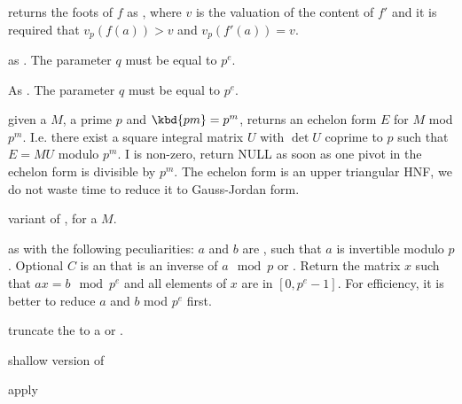 returns the foots of $f$ as , where $v$ is the valuation
of the content of $f'$ and it is required that $v_p(f(a))>v$ and
$v_p(f'(a))=v$.


as . The parameter $q$ must be equal to $p^e$.

As . The parameter $q$ must be equal to $p^e$.






 given a
 $M$, a prime $p$ and $\kbd{pm} = p^m$, returns an echelon form
$E$ for $M$ mod $p^m$. I.e. there exist a square integral matrix $U$ with
$\det U$ coprime to $p$ such that $E = MU$ modulo $p^m$. I
 is non-zero, return NULL as soon as one pivot in
the echelon form is divisible by $p^m$. The echelon form is an upper
triangular HNF, we do not waste time to reduce it to Gauss-Jordan form.

variant of , for a  $M$.

 as 
with the following peculiarities: $a$ and $b$ are , such that $a$ is
invertible modulo $p$. Optional $C$ is an  that is an inverse of
$a\mod p$ or . Return the matrix $x$ such that $ax=b\mod p^e$ and
all elements of $x$ are in $[0,p^e-1]$. For efficiency, it is better
to reduce $a$ and $b$ mod $p^e$ first.

 truncate the  to a  or
.

 shallow version of 

 apply 

